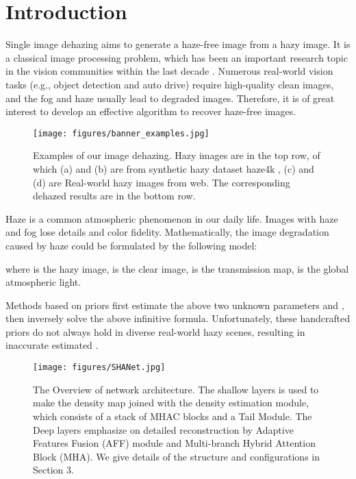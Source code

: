 \documentclass[final]{cvpr}
\begin{document}
\section{Introduction}
Single image dehazing aims to generate a haze-free image from a hazy image. It is a classical image processing problem, which has been an important research topic in the vision communities within the last decade \cite{ffa-net,wu2021contrastive,2021ntire,ancuti2020ntire}. Numerous real-world vision tasks (e.g., object detection and auto drive) require high-quality clean images, and the fog and haze usually lead to degraded images. Therefore, it is of great interest to develop an effective algorithm to recover haze-free images.

\begin{figure}
    \centering
    \texttt{[image: figures/banner\_examples.jpg]}
    \caption{Examples of our image dehazing. Hazy images are in the top row, of which (a) and (b) are from synthetic hazy dataset haze4k \cite{liu2021synthetic}, (c) and (d) are Real-world hazy images from web. The corresponding dehazed results are in the bottom row.}
    \label{fig:banner_examples}
\end{figure}


Haze is a common atmospheric phenomenon in our daily life. Images with haze and fog lose details and color fidelity. Mathematically, the image degradation caused by haze could be formulated by the following model:

where  is the hazy image,  is the clear image, 
 is the transmission map,  is the global atmospheric light.


Methods \cite{he2010single, fattal2014dehazing,berman2016non,jiang2017image} based on priors first estimate the above two unknown parameters  and , then inversely solve the above infinitive formula.
Unfortunately, these handcrafted priors do not always hold in diverse real-world hazy scenes, resulting in inaccurate estimated . 

\begin{figure*}[t]
    \centering
    \texttt{[image: figures/SHANet.jpg]}
    \caption{The Overview of network architecture.
The shallow layers is used to make the density map joined with the density estimation module, 
which consists of a stack of MHAC blocks and a Tail Module.
The Deep layers emphasize on detailed reconstruction by Adaptive Features Fusion (AFF) module and Multi-branch Hybrid Attention Block (MHA).
We give details of the structure and configurations in Section 3.}
    \label{fig:SHA-Net}
\end{figure*}
\end{document}
